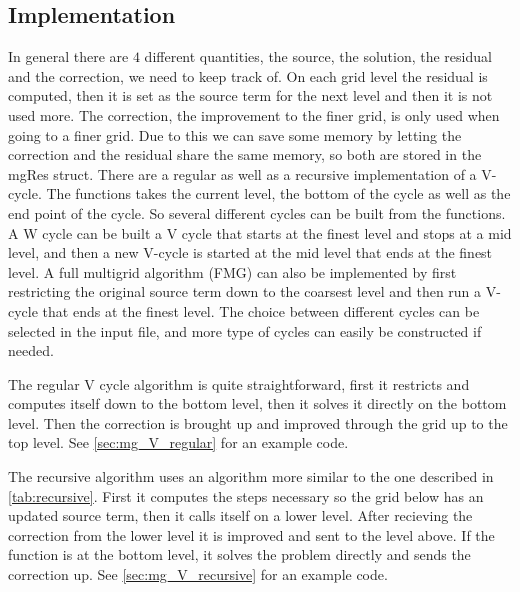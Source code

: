 
\subsection{Implementation}
	In general there are \(4\) different quantities, the source, the solution, the residual and the correction, we need to keep track of.
	On each grid level the residual is computed, then it is set as the source term for the next level and then it is not used more.
	The correction, the improvement to the finer grid, is only used when going to a finer grid. Due to this we can save some memory by
	letting the correction and the residual share the same memory, so both are stored in the mgRes struct. There are a regular as well as a recursive implementation
	of a V-cycle. The functions takes the current level, the bottom of the cycle as well as the end point of the cycle. So several different cycles
	can be built from the functions. A W cycle can be built a V cycle that starts at the finest level and stops at a mid level, and then a new V-cycle is started at
	the mid level that ends at the finest level. A full multigrid algorithm (FMG) can also be implemented by first restricting the original source term down to the coarsest
	level and then run a V-cycle that ends at the finest level. The choice between different cycles can be selected in the input file,
	and more type of cycles can easily be constructed if needed.

	The regular V cycle algorithm is quite straightforward, first it restricts and computes itself down to the bottom level,
	then it solves it directly on the bottom level. Then the correction is brought up and improved through the grid up to the top level.
	See \cref{sec:mg_V_regular} for an example code.

	The recursive algorithm uses an algorithm more similar to the one described in \cref{tab:recursive}. First it computes the steps necessary
	so the grid below has an updated source term, then it calls itself on a lower level. After recieving the correction from
	the lower level it is improved and sent to the level above. If the function is at the bottom level, it solves the problem directly and sends
	the correction up. See \cref{sec:mg_V_recursive} for an example code.

